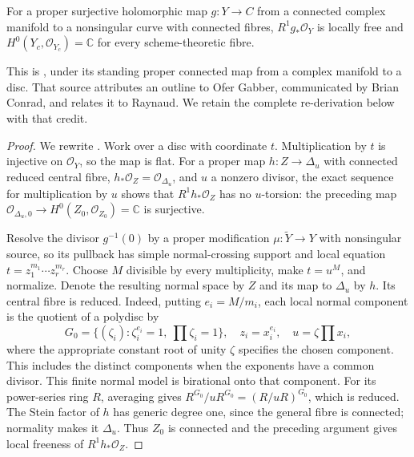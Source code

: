 
\begin{proposition}\label{cdp:st:E4}
For a proper surjective holomorphic map $g:Y\to C$ from a connected complex
manifold to a nonsingular curve with connected fibres,
$R^1g_*\mathcal O_Y$ is locally free and
$H^0(Y_c,\mathcal O_{Y_c})=\mathbb C$ for every scheme-theoretic fibre.
\end{proposition}

This is \citet[Theorem~2.2, pp.~4--5]{Viaclovsky2026Combs}, under its standing proper connected map from a complex manifold to a disc. That source attributes an outline to Ofer Gabber, communicated by Brian Conrad, and relates it to Raynaud. We retain the complete re-derivation below with that credit.

\begin{proof}
We rewrite \cite[Theorem labelled \texttt{raynaud}]{Viaclovsky2026Combs}.
Work over a disc with coordinate
$t$. Multiplication by $t$ is injective on $\mathcal O_Y$, so the map
is flat. For a proper map $h:Z\to\Delta_u$ with connected reduced
central fibre, $h_*\mathcal O_Z=\mathcal O_{\Delta_u}$, and $u$ a
nonzero divisor, the exact sequence for multiplication by $u$ shows
that $R^1h_*\mathcal O_Z$ has no $u$-torsion: the preceding map
$\mathcal O_{\Delta_u,0}\to H^0(Z_0,\mathcal O_{Z_0})=\mathbb C$
is surjective.

Resolve the divisor $g^{-1}(0)$ by a proper modification
$\mu:\widetilde Y\to Y$ with nonsingular source, so its pullback has
simple normal-crossing support and local equation
$t=z_1^{m_1}\cdots z_r^{m_r}$. Choose $M$ divisible by every
multiplicity, make $t=u^M$, and normalize. Denote the resulting
normal space by $Z$ and its map to $\Delta_u$ by $h$. Its central
fibre is reduced. Indeed, putting $e_i=M/m_i$, each local normal
component is the quotient of a polydisc by
\[
 G_0=\{(\zeta_i):\zeta_i^{e_i}=1,\ \prod\zeta_i=1\},
 \quad z_i=x_i^{e_i},\quad u=\zeta\prod x_i,
\]
where the appropriate constant root of unity $\zeta$ specifies the
chosen component. This includes the distinct components when the
exponents have a common divisor. This finite normal model is
birational onto that component.
For its power-series ring $R$, averaging gives
$R^{G_0}/uR^{G_0}=(R/uR)^{G_0}$, which is reduced. The Stein factor
of $h$ has generic degree one, since the general fibre is connected;
normality makes it $\Delta_u$. Thus $Z_0$ is connected and the
preceding argument gives local freeness of $R^1h_*\mathcal O_Z$.


\end{proof}

